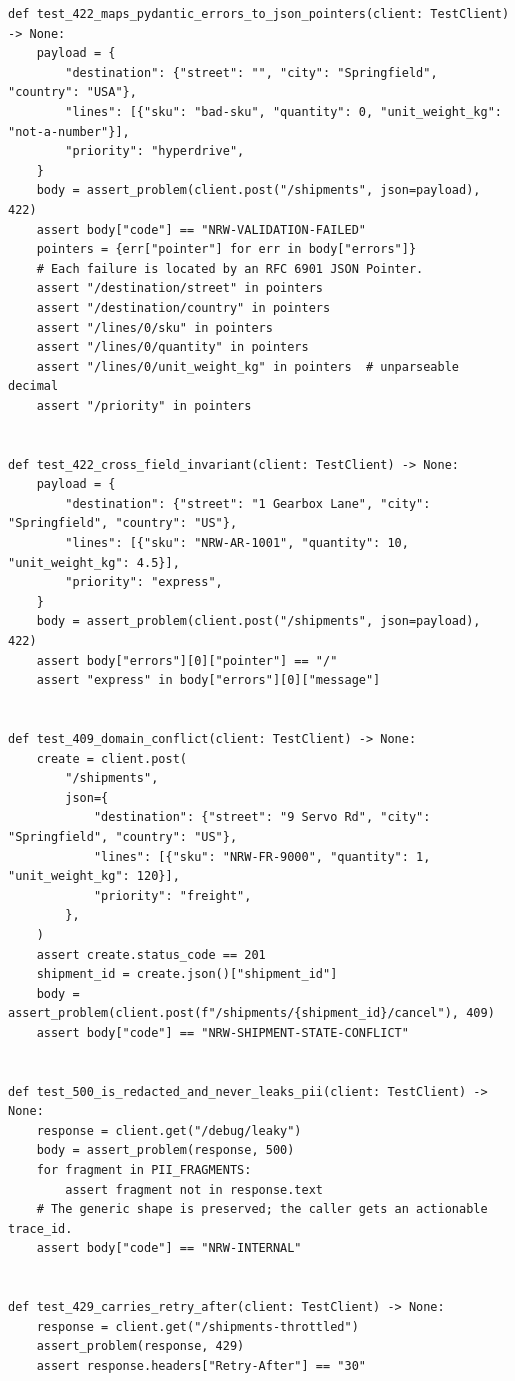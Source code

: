\begin{verbatim}
def test_422_maps_pydantic_errors_to_json_pointers(client: TestClient) -> None:
    payload = {
        "destination": {"street": "", "city": "Springfield", "country": "USA"},
        "lines": [{"sku": "bad-sku", "quantity": 0, "unit_weight_kg": "not-a-number"}],
        "priority": "hyperdrive",
    }
    body = assert_problem(client.post("/shipments", json=payload), 422)
    assert body["code"] == "NRW-VALIDATION-FAILED"
    pointers = {err["pointer"] for err in body["errors"]}
    # Each failure is located by an RFC 6901 JSON Pointer.
    assert "/destination/street" in pointers
    assert "/destination/country" in pointers
    assert "/lines/0/sku" in pointers
    assert "/lines/0/quantity" in pointers
    assert "/lines/0/unit_weight_kg" in pointers  # unparseable decimal
    assert "/priority" in pointers


def test_422_cross_field_invariant(client: TestClient) -> None:
    payload = {
        "destination": {"street": "1 Gearbox Lane", "city": "Springfield", "country": "US"},
        "lines": [{"sku": "NRW-AR-1001", "quantity": 10, "unit_weight_kg": 4.5}],
        "priority": "express",
    }
    body = assert_problem(client.post("/shipments", json=payload), 422)
    assert body["errors"][0]["pointer"] == "/"
    assert "express" in body["errors"][0]["message"]


def test_409_domain_conflict(client: TestClient) -> None:
    create = client.post(
        "/shipments",
        json={
            "destination": {"street": "9 Servo Rd", "city": "Springfield", "country": "US"},
            "lines": [{"sku": "NRW-FR-9000", "quantity": 1, "unit_weight_kg": 120}],
            "priority": "freight",
        },
    )
    assert create.status_code == 201
    shipment_id = create.json()["shipment_id"]
    body = assert_problem(client.post(f"/shipments/{shipment_id}/cancel"), 409)
    assert body["code"] == "NRW-SHIPMENT-STATE-CONFLICT"


def test_500_is_redacted_and_never_leaks_pii(client: TestClient) -> None:
    response = client.get("/debug/leaky")
    body = assert_problem(response, 500)
    for fragment in PII_FRAGMENTS:
        assert fragment not in response.text
    # The generic shape is preserved; the caller gets an actionable trace_id.
    assert body["code"] == "NRW-INTERNAL"


def test_429_carries_retry_after(client: TestClient) -> None:
    response = client.get("/shipments-throttled")
    assert_problem(response, 429)
    assert response.headers["Retry-After"] == "30"



\end{verbatim}
